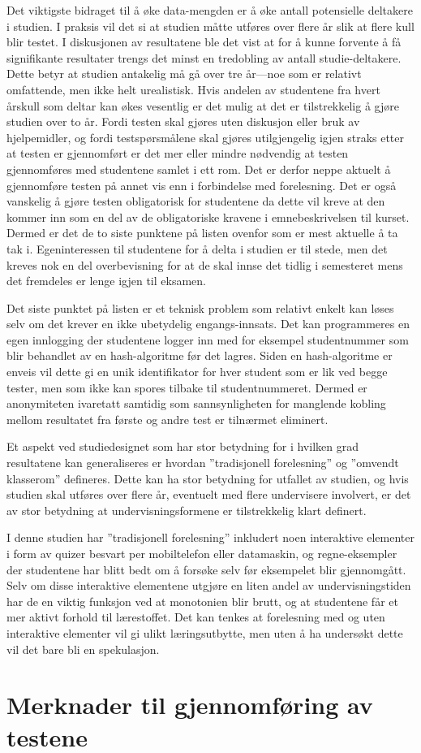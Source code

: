 \documentclass[a4paper,norsk,12pt]{report}
\begin{document}
Det viktigste bidraget til å øke data-mengden er å øke antall potensielle deltakere i studien. I praksis vil det si at studien måtte utføres over flere år slik at flere kull blir testet. I diskusjonen av resultatene ble det vist at for å kunne forvente å få signifikante resultater trengs det minst en tredobling av antall studie-deltakere. Dette betyr at studien antakelig må gå over tre år---noe som er relativt omfattende, men ikke helt urealistisk. Hvis andelen av studentene fra hvert årskull som deltar kan økes vesentlig er det mulig at det er tilstrekkelig å gjøre studien over to år. Fordi testen skal gjøres uten diskusjon eller bruk av hjelpemidler, og fordi testspørsmålene skal gjøres utilgjengelig igjen straks etter at testen er gjennomført er det mer eller mindre nødvendig at testen gjennomføres med studentene samlet i ett rom. Det er derfor neppe aktuelt å gjennomføre testen på annet vis enn i forbindelse med forelesning. Det er også vanskelig å gjøre testen obligatorisk for studentene da dette vil kreve at den kommer inn som en del av de obligatoriske kravene i emnebeskrivelsen til kurset. Dermed er det de to siste punktene på listen ovenfor som er mest aktuelle å ta tak i. Egeninteressen til studentene for å delta i studien er til stede, men det kreves nok en del overbevisning for at de skal innse det tidlig i semesteret mens det fremdeles er lenge igjen til eksamen. 

Det siste punktet på listen er et teknisk problem som relativt enkelt kan løses selv om det krever en ikke ubetydelig engangs-innsats. Det kan programmeres en egen innlogging der studentene logger inn med for eksempel studentnummer som blir behandlet av en hash-algoritme før det lagres. Siden en hash-algoritme er enveis vil dette gi en unik identifikator for hver student som er lik ved begge tester, men som ikke kan spores tilbake til studentnummeret. Dermed er anonymiteten ivaretatt samtidig som sannsynligheten for manglende kobling mellom resultatet fra første og andre test er tilnærmet eliminert.

Et  aspekt ved studiedesignet som har stor betydning for i hvilken grad resultatene kan generaliseres er hvordan ''tradisjonell forelesning'' og ''omvendt klasserom'' defineres. Dette kan ha stor betydning for utfallet av studien, og hvis studien skal utføres over flere år, eventuelt med flere undervisere involvert, er det av stor betydning at undervisningsformene er tilstrekkelig klart definert. 

I denne studien har ''tradisjonell forelesning'' inkludert noen interaktive elementer i form av quizer besvart per mobiltelefon eller datamaskin, og regne-eksempler der studentene har blitt bedt om å forsøke selv før eksempelet blir gjennomgått. Selv om disse interaktive elementene utgjøre en liten andel av undervisningstiden har de en viktig funksjon ved at monotonien blir brutt, og at studentene får et mer aktivt forhold til lærestoffet. Det kan tenkes at forelesning med og uten interaktive elementer vil gi ulikt læringsutbytte, men uten å ha undersøkt dette vil det bare bli en spekulasjon.


\appendix
\chapter{Merknader til gjennomføring av testene}



\end{document}

